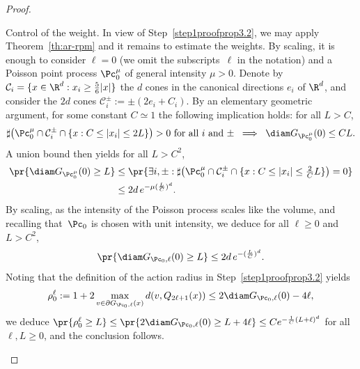 \begin{proof}
\begin{step}{Control of the weight.}\label{step2proofprop3.2}
\noindent In view of Step~\ref{step1proofprop3.2}, we may apply Theorem~\ref{th:ar-rpm} and it remains to estimate the weights. By scaling, it is enough to consider $\ell=0$ (we omit the subscripts~$\ell$ in the notation) and a Poisson point process $\Pc_0^\mu$ of general intensity $\mu>0$. Denote by $\mathcal C_i=\{x\in \R^d:x_i\ge \frac56 |x|\}$ the $d$ cones in the canonical directions $e_i$ of $\R^d$, and consider the $2d$ cones $\mathcal C_i^\pm:=\pm (2e_i+C_i)$. By an elementary geometric argument, for some constant $C\simeq1$ the following implication holds: for all $L>C$,
\[
\sharp \big(\Pc_0^\mu \cap \mathcal C_i^\pm \cap \{x:C\le |x_i|\le 2L\}\big)>0 \text{ for all }i \text{ and }\pm \; \implies \; \diam G_{\Pc_0^\mu}(0)\le CL.
\]
A union bound then yields for all $L>C^2$,
\begin{align*}
\pr{ \diam G_{\Pc_0^\mu}(0) \ge L} &\le\pr{\exists i, \pm: \sharp \big(\Pc_0^\mu \cap \mathcal C_i^\pm \cap \{x:C\le |x_i|\le\tfrac 2C L\}\big)=0}\\
&\le 2d\,e^{-\mu (\frac LC)^d}.
\end{align*}
By scaling, as the intensity of the Poisson process scales like the volume, and recalling that~$\Pc_0$ is chosen with unit intensity, we deduce for all $\ell\ge0$ and $L>C^2$,
\[
\pr{ \diam G_{\Pc_0,\ell}(0) \ge L}\le2d\,e^{-(\frac LC)^d}.
\]
Noting that the definition of the action radius in Step~\ref{step1proofprop3.2} yields
\[
\rho_0^{\ell}:= 1+2\max_{v\in \partial G_{\Pc_0,\ell}(x)}d(v,Q_{2\ell+1}(x))\le2\diam G_{\Pc_0,\ell}(0)-4\ell,
\]
we deduce $\pr{\rho_0^\ell\ge L}\le \pr{2\diam G_{\Pc_0,\ell}(0)\ge L+4\ell}\le Ce^{-\frac1C(L+\ell)^d}$ for all $\ell,L\ge0$, and the conclusion follows.
\end{step}
\end{proof}



